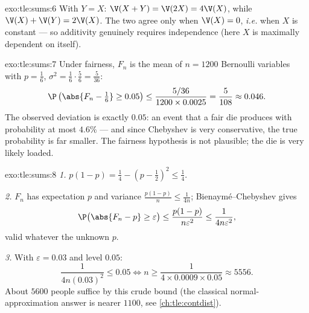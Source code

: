 \begin{solution}{exo:tle:sums:6}
With $Y = X$: $\V(X + Y) = \V(2X) = 4\V(X)$, while
$\V(X) + \V(Y) = 2\V(X)$. The two agree only when $\V(X) = 0$, \emph{i.e.}
when $X$ is constant --- so additivity genuinely requires independence
(here $X$ is maximally dependent on itself).
\end{solution}

\begin{solution}{exo:tle:sums:7}
Under fairness, $F_n$ is the mean of $n = 1200$ Bernoulli variables with
$p = \frac16$, $\sigma^2 = \frac16\cdot\frac56 = \frac{5}{36}$:
\[
\P\left(\abs{F_n - \tfrac16} \geq 0.05\right)
\leq \frac{5/36}{1200 \times 0.0025} = \frac{5}{108} \approx 0.046 .
\]
The observed deviation is exactly $0.05$: an event that a fair die produces
with probability at most $4.6\%$ --- and since Chebyshev is very
conservative, the true probability is far smaller. The fairness hypothesis
is not plausible; the die is very likely loaded.
\end{solution}

\begin{solution}{exo:tle:sums:8}
\emph{1.} $p(1-p) = \frac14 - \left(p - \frac12\right)^2 \leq \frac14$.

\emph{2.} $F_n$ has expectation $p$ and variance
$\frac{p(1-p)}{n} \leq \frac{1}{4n}$; Bienaymé--Chebyshev gives
\[
\P\bigl(\abs{F_n - p} \geq \varepsilon\bigr)
\leq \frac{p(1-p)}{n\varepsilon^2} \leq \frac{1}{4n\varepsilon^2},
\]
valid whatever the unknown $p$.

\emph{3.} With $\varepsilon = 0.03$ and level $0.05$:
\[
\frac{1}{4n(0.03)^2} \leq 0.05
\iff n \geq \frac{1}{4 \times 0.0009 \times 0.05} \approx 5556 .
\]
About $5600$ people suffice by this crude bound (the classical
normal-approximation answer is nearer $1100$, see
\cref{ch:tle:contdist}).
\end{solution}
